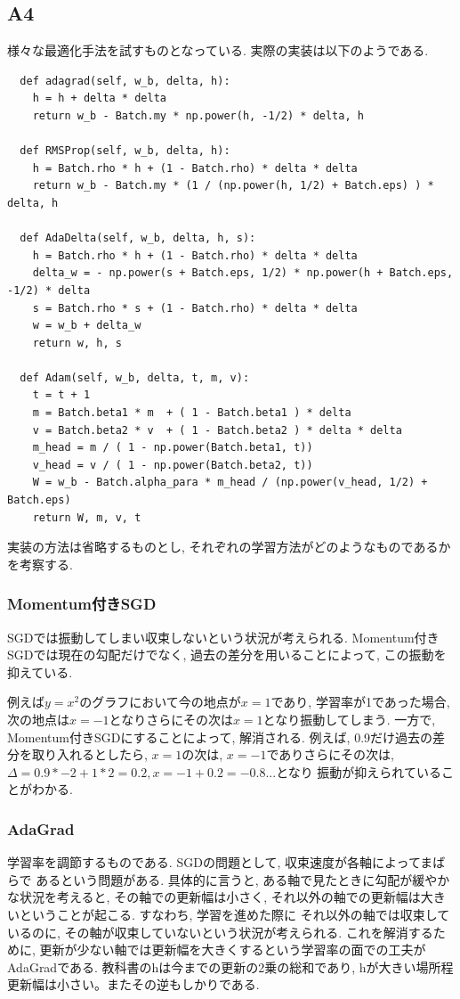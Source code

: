 \documentclass[a4paper,11pt]{jsarticle}
\begin{document}
\subsection{A4}
様々な最適化手法を試すものとなっている. 実際の実装は以下のようである.
\begin{lstlisting}
  def adagrad(self, w_b, delta, h):
    h = h + delta * delta
    return w_b - Batch.my * np.power(h, -1/2) * delta, h

  def RMSProp(self, w_b, delta, h):
    h = Batch.rho * h + (1 - Batch.rho) * delta * delta
    return w_b - Batch.my * (1 / (np.power(h, 1/2) + Batch.eps) ) * delta, h

  def AdaDelta(self, w_b, delta, h, s):
    h = Batch.rho * h + (1 - Batch.rho) * delta * delta
    delta_w = - np.power(s + Batch.eps, 1/2) * np.power(h + Batch.eps, -1/2) * delta
    s = Batch.rho * s + (1 - Batch.rho) * delta * delta
    w = w_b + delta_w
    return w, h, s

  def Adam(self, w_b, delta, t, m, v):
    t = t + 1
    m = Batch.beta1 * m  + ( 1 - Batch.beta1 ) * delta
    v = Batch.beta2 * v  + ( 1 - Batch.beta2 ) * delta * delta
    m_head = m / ( 1 - np.power(Batch.beta1, t))
    v_head = v / ( 1 - np.power(Batch.beta2, t))
    W = w_b - Batch.alpha_para * m_head / (np.power(v_head, 1/2) + Batch.eps)
    return W, m, v, t
\end{lstlisting}
実装の方法は省略するものとし, それぞれの学習方法がどのようなものであるかを考察する.

\subsubsection*{Momentum付きSGD}
SGDでは振動してしまい収束しないという状況が考えられる.
Momentum付きSGDでは現在の勾配だけでなく, 過去の差分を用いることによって,
この振動を抑えている.

例えば$ y = x^2 $のグラフにおいて今の地点が$x = 1$であり, 学習率が1であった場合, 
次の地点は$x = -1$となりさらにその次は$x = 1$となり振動してしまう.
一方で, Momentum付きSGDにすることによって, 解消される. 例えば, 0.9だけ過去の差分を取り入れるとしたら, 
$x = 1$の次は, $x = - 1$でありさらにその次は, $\Delta = 0.9 * -2 + 1 * 2 = 0.2, x = -1 + 0.2 = -0.8$...となり
振動が抑えられていることがわかる.
\subsubsection*{AdaGrad}
学習率を調節するものである. SGDの問題として, 収束速度が各軸によってまばらで
あるという問題がある. 具体的に言うと, ある軸で見たときに勾配が緩やかな状況を考えると, 
その軸での更新幅は小さく, それ以外の軸での更新幅は大きいということが起こる. すなわち, 学習を進めた際に
それ以外の軸では収束しているのに, その軸が収束していないという状況が考えられる.
これを解消するために, 更新が少ない軸では更新幅を大きくするという学習率の面での工夫がAdaGradである.
教科書のhは今までの更新の2乗の総和であり, hが大きい場所程更新幅は小さい。またその逆もしかりである.
\end{document}
